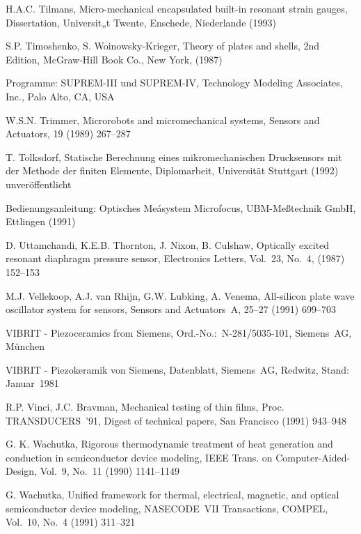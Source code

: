 \begin{thebibliography}{xxx}
 H.A.C. Tilmans, Micro-mechanical encapsulated built-in resonant strain
 gauges, Dissertation, Universit„t Twente, Enschede, Niederlande (1993)

 S.P. Timoshenko, S. Woinowsky-Krieger, Theory of plates and shells,
 2nd Edition, McGraw-Hill Book Co., New York, (1987)

 Programme: SUPREM-III und SUPREM-IV, Technology Modeling Associates, Inc.,
 Palo Alto, CA, USA

 W.S.N. Trimmer, Microrobots and micromechanical systems, Sensors and
 Actuators, 19 (1989) 267--287

 T. Tolksdorf, Statische Berechnung eines mikromechanischen Drucksensors
 mit der Methode der finiten Elemente, Diplomarbeit, Universität Stuttgart
 (1992) unveröffentlicht

 Bedienungsanleitung: Optisches Meásystem Microfocus, UBM-Meßtechnik GmbH,
 Ettlingen (1991)

 D. Uttamchandi, K.E.B. Thornton, J. Nixon, B. Culshaw, Optically excited
 resonant diaphragm pressure sensor, Electronics Letters, Vol.~23, No.~4,
 (1987) 152--153

 M.J. Vellekoop, A.J. van Rhijn, G.W. Lubking, A. Venema, All-silicon plate
 wave oscillator system for sensors, Sensors and Actuators~A, 25--27 (1991) 699--703

 VIBRIT - Piezoceramics from Siemens, Ord.-No.:~N-281/5035-101, Siemens~AG,
 München

 VIBRIT - Piezokeramik von Siemens, Datenblatt, Siemens~AG, Redwitz,
 Stand: Januar~1981

 R.P. Vinci, J.C. Bravman, Mechanical testing of thin films, Proc.
 TRANSDUCERS~'91, Digest of technical papers, San Francisco (1991) 943--948

 G. K. Wachutka, Rigorous thermodynamic treatment of heat generation and
 conduction in semiconductor device modeling, IEEE Trans. on
 Computer-Aided-Design, Vol.~9, No.~11 (1990) 1141--1149

 G. Wachutka, Unified framework for thermal, electrical, magnetic, and
 optical semiconductor device modeling, NASECODE~VII Transactions, COMPEL,
 Vol.~10, No.~4 (1991) 311--321


\end{thebibliography}
